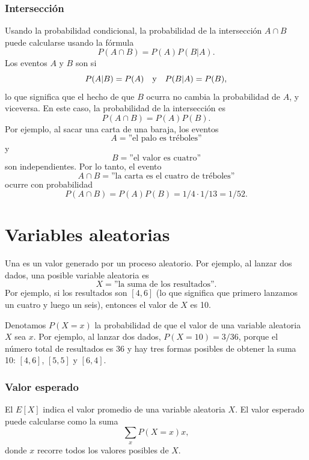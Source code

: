 \subsubsection{Intersección}


Usando la probabilidad condicional,
la probabilidad de la intersección
$A \cap B$ puede calcularse usando la fórmula
\[P(A \cap B)=P(A)P(B|A).\]
Los eventos $A$ y $B$ son  si
\[P(A|B)=P(A) \hspace{10px}\textrm{y}\hspace{10px} P(B|A)=P(B),\]
lo que significa que el hecho de que $B$ ocurra no
cambia la probabilidad de $A$, y viceversa.
En este caso, la probabilidad de la intersección es
\[P(A \cap B)=P(A)P(B).\]
Por ejemplo, al sacar una carta de una baraja, los eventos
\[A = \textrm{''el palo es tréboles''}\]
y
\[B = \textrm{''el valor es cuatro''}\]
son independientes. Por lo tanto, el evento
\[A \cap B = \textrm{''la carta es el cuatro de tréboles''}\]
ocurre con probabilidad
\[P(A \cap B)=P(A)P(B)=1/4 \cdot 1/13 = 1/52.\]

\section{Variables aleatorias}


Una  es un valor generado
por un proceso aleatorio.
Por ejemplo, al lanzar dos dados,
una posible variable aleatoria es
\[X=\textrm{''la suma de los resultados''}.\]
Por ejemplo, si los resultados son $[4,6]$
(lo que significa que primero lanzamos un cuatro y luego un seis),
entonces el valor de $X$ es 10.

Denotamos $P(X=x)$ la probabilidad de que
el valor de una variable aleatoria $X$ sea $x$.
Por ejemplo, al lanzar dos dados,
$P(X=10)=3/36$,
porque el número total de resultados es 36
y hay tres formas posibles de obtener
la suma 10: $[4,6]$, $[5,5]$ y $[6,4]$.

\subsubsection{Valor esperado}


El  $E[X]$ indica el
valor promedio de una variable aleatoria $X$.
El valor esperado puede calcularse como la suma
\[\sum_x P(X=x)x,\]
donde $x$ recorre todos los valores posibles de $X$.

